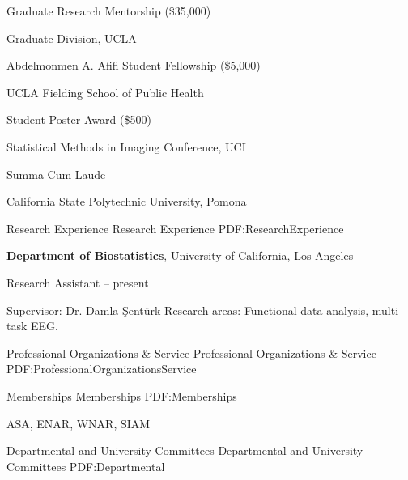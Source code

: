 \documentclass[letterpaper,MMMyyyy,nonstopmode]{simpleresumecv}
\begin{document}
\begin{Body}
Graduate Research Mentorship (\$35,000) \hfill {}
\begin{Detail} 
Graduate Division, UCLA
\end{Detail}
\BigGap

Abdelmonmen A. Afifi Student Fellowship (\$5,000) \hfill {}
\begin{Detail} 
UCLA Fielding School of Public Health 
\end{Detail}
\BigGap

Student Poster Award  (\$500) \hfill {}
\begin{Detail} 
Statistical Methods in Imaging Conference, UCI
\end{Detail}
\BigGap

Summa Cum Laude \hfill {}
\begin{Detail} 
California State Polytechnic University, Pomona
\end{Detail}


\Section
{Research Experience}
{Research Experience}
{PDF:ResearchExperience}

\Entry
\href{http://www.example.com/my-institute}
{\textbf{Department of Biostatistics}},
University of California, Los Angeles

Research Assistant
\hfill
{} -- present
\begin{Detail}
\SubBulletItem
Supervisor:
Dr. Damla \c{S}ent\"{u}rk
\SubBulletItem
Research areas:
Functional data analysis, multi-task EEG.
\end{Detail}



\Section
{Professional Organizations\newline
\& Service}
{Professional Organizations \& Service}
{PDF:ProfessionalOrganizationsService}

\SubSection
{Memberships}
{Memberships}
{PDF:Memberships}

\BigGap

ASA, ENAR, WNAR, SIAM

\BigGap

\SubSection 
{Departmental and University Committees}
{Departmental and University Committees} 
{PDF:Departmental} 

\BigGap 


\end{Body}
\end{document}
